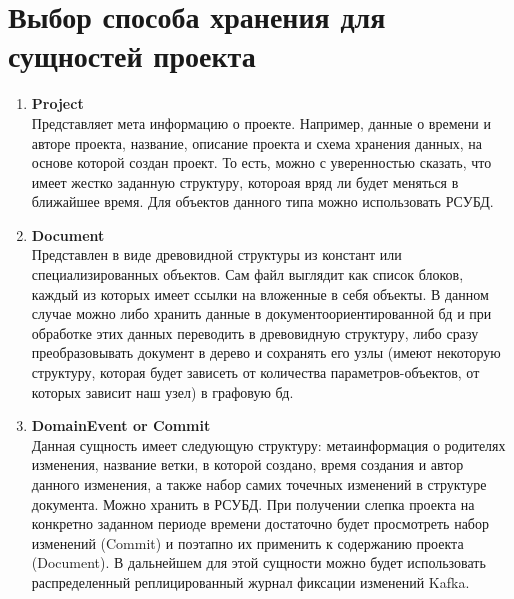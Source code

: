 \documentclass[14pt, a4paper, russian]{report}
\begin{document}
\section{Выбор способа хранения для сущностей проекта}

\begin{enumerate}
	\item \textbf{Project} \\
	Представляет мета информацию о проекте. Например, данные о времени и авторе проекта, название, описание проекта и схема хранения данных, на основе которой создан проект. То есть, можно с уверенностью сказать, что имеет жестко заданную структуру, котороая вряд ли будет меняться в ближайшее время. Для объектов данного типа можно использовать РСУБД. \\
	\item \textbf{Document} \\
	Представлен в виде древовидной структуры из констант или специализированных объектов. Сам файл выглядит как список блоков, каждый из которых имеет ссылки на вложенные в себя объекты. В данном случае можно либо хранить данные в документоориентированной бд и при обработке этих данных переводить в древовидную структуру, либо сразу преобразовывать документ в дерево и сохранять его узлы (имеют некоторую структуру, которая будет зависеть от количества параметров-объектов, от которых зависит наш узел) в графовую бд.
	\item \textbf{DomainEvent or Commit} \\
	Данная сущность имеет следующую структуру: метаинформация о родителях изменения, название ветки, в которой создано, время создания и автор данного изменения, а также набор самих точечных изменений в структуре документа. Можно хранить в РСУБД. При получении слепка проекта на конкретно заданном периоде времени достаточно будет просмотреть набор изменений (Commit) и поэтапно их применить к содержанию проекта (Document). В дальнейшем для этой сущности можно будет использовать распределенный реплицированный журнал фиксации изменений Kafka.
\end{enumerate}
\end{document}
